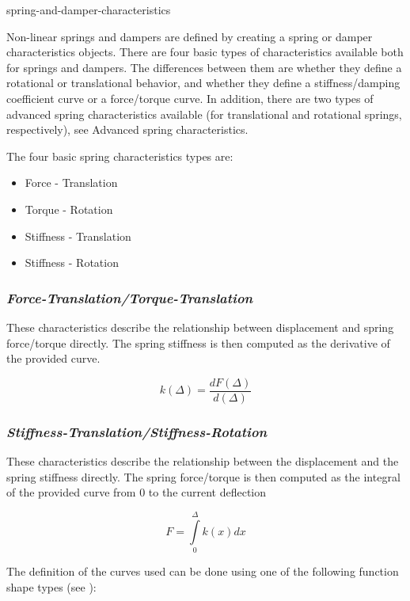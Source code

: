 {spring-and-damper-characteristics}

Non-linear springs and dampers are defined by creating a spring or
damper characteristics objects. There are four basic types of
characteristics available both for springs and dampers. The differences
between them are whether they define a rotational or translational
behavior, and whether they define a stiffness/damping coefficient curve
or a force/torque curve. In addition, there are two types of advanced
spring characteristics available (for translational and rotational
springs, respectively), see 
{Advanced spring characteristics}.


The four basic spring characteristics types are:

\begin{itemize} \setlength\itemsep{0.2em}
  \item Force - Translation
  \item Torque - Rotation
  \item Stiffness - Translation
  \item Stiffness - Rotation
  \end{itemize}

\subsubsection{\sl\textbf{Force-Translation/Torque-Translation}}

These characteristics describe the relationship between displacement
and spring force/torque directly. The spring stiffness is then computed as
the derivative of the provided curve.

$$
  k(\Delta) = \frac{dF(\Delta)}{d(\Delta)}
$$

\subsubsection{\sl\textbf{Stiffness-Translation/Stiffness-Rotation}}

These characteristics describe the relationship between the displacement
and the spring stiffness directly. The spring force/torque is then computed as
the integral of the provided curve from 0 to the current deflection

$$
  F = \int\limits_0^\Delta k(x) dx
$$

The definition of the curves used can be done using one of the following
function shape types (see ):

